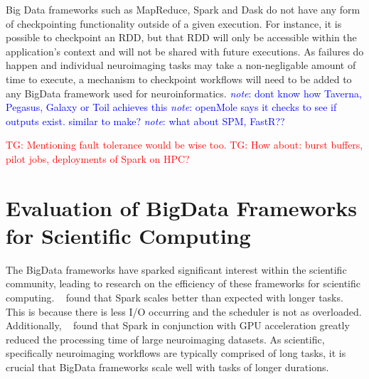 \documentclass{report}
\newcommand{\note}[1]{\textcolor{blue}{\textit{note}: #1}}
\newcommand{\tristan}[1]{\textcolor{red}{TG: #1}}
\begin{document}
            Big Data frameworks such as MapReduce, Spark and Dask do not have   
            any form of checkpointing functionality outside of a given          
            execution. For instance, it is possible to checkpoint an RDD, but   
            that RDD will only be accessible within the application's context   
            and will not be shared with future executions. As failures do       
            happen and individual neuroimaging tasks may take a non-negligable  
            amount of time to execute, a mechanism to checkpoint workflows      
            will need to be added to any BigData framework used for             
            neuroinformatics.                                                   
            \note{dont know how Taverna, Pegasus, Galaxy or Toil achieves this} 
            \note{openMole says it checks to see if outputs exist. similar to   
            make?}                                                              
            \note{what about SPM, FastR??}                                      
                                                                                
            \tristan{Mentioning fault tolerance would be wise too.}             
            \tristan{How about: burst buffers, pilot jobs, deployments of Spark on HPC?}
                                                                                
        \section{Evaluation of BigData Frameworks for Scientific Computing}     
            The BigData frameworks have sparked significant interest within the 
            scientific community, leading to research on the efficiency of      
            these frameworks for scientific computing. ~\cite{valduriez} found  
            that Spark scales better than expected with longer tasks. This is   
            because                                                             
            there is less I/O occurring and the scheduler is not as overloaded. 
            Additionally, ~\cite{Boubela} found that Spark in conjunction with  
            GPU acceleration greatly reduced the processing time of large       
            neuroimaging datasets.                                              
            As scientific, specifically neuroimaging workflows are typically    
            comprised of long tasks, it                                         
            is crucial that BigData frameworks scale well with tasks of longer  
            durations.
    
\end{document}
